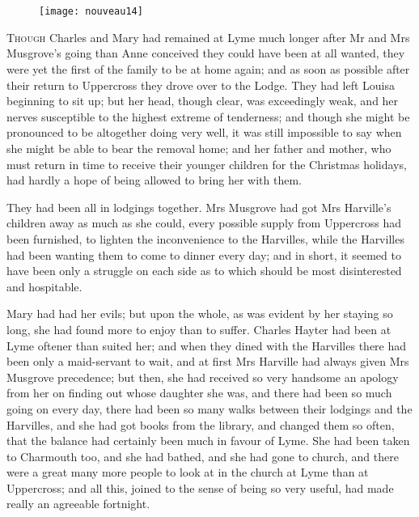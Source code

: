 \chapter[Chapter \thechapter]{}

\begin{figure}[t!]
\centering
\texttt{[image: nouveau14]}
\end{figure}

\lettrine[lraise=0.3]{T}{hough} Charles and Mary had remained at Lyme much longer after Mr and Mrs Musgrove's going than Anne conceived they could have been at all wanted, they were yet the first of the family to be at home again; and as soon as possible after their return to Uppercross they drove over to the Lodge. They had left Louisa beginning to sit up; but her head, though clear, was exceedingly weak, and her nerves susceptible to the highest extreme of tenderness; and though she might be pronounced to be altogether doing very well, it was still impossible to say when she might be able to bear the removal home; and her father and mother, who must return in time to receive their younger children for the Christmas holidays, had hardly a hope of being allowed to bring her with them.

They had been all in lodgings together. Mrs Musgrove had got Mrs Harville's children away as much as she could, every possible supply from Uppercross had been furnished, to lighten the inconvenience to the Harvilles, while the Harvilles had been wanting them to come to dinner every day; and in short, it seemed to have been only a struggle on each side as to which should be most disinterested and hospitable.

Mary had had her evils; but upon the whole, as was evident by her staying so long, she had found more to enjoy than to suffer. Charles Hayter had been at Lyme oftener than suited her; and when they dined with the Harvilles there had been only a maid-servant to wait, and at first Mrs Harville had always given Mrs Musgrove precedence; but then, she had received so very handsome an apology from her on finding out whose daughter she was, and there had been so much going on every day, there had been so many walks between their lodgings and the Harvilles, and she had got books from the library, and changed them so often, that the balance had certainly been much in favour of Lyme. She had been taken to Charmouth too, and she had bathed, and she had gone to church, and there were a great many more people to look at in the church at Lyme than at Uppercross; and all this, joined to the sense of being so very useful, had made really an agreeable fortnight.


